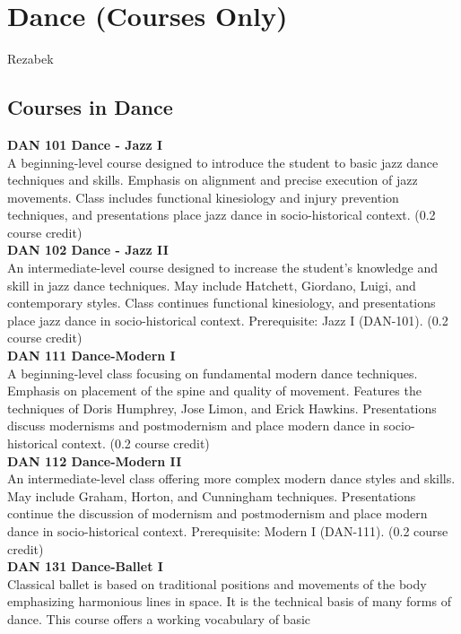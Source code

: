 \documentclass[
  letterpaper,
]{scrbook}
\begin{document}
\section{Dance (Courses Only)}\label{dance-courses-only}

Rezabek

\subsection{Courses in Dance}\label{courses-in-dance}

\textbf{DAN 101 Dance - Jazz I}\\
A beginning-level course designed to introduce the student to basic jazz
dance techniques and skills. Emphasis on alignment and precise execution
of jazz movements. Class includes functional kinesiology and injury
prevention techniques, and presentations place jazz dance in
socio-historical context. (0.2 course credit)\\
\textbf{DAN 102 Dance - Jazz II}\\
An intermediate-level course designed to increase the student's
knowledge and skill in jazz dance techniques. May include Hatchett,
Giordano, Luigi, and contemporary styles. Class continues functional
kinesiology, and presentations place jazz dance in socio-historical
context. Prerequisite: Jazz I (DAN-101). (0.2 course credit)\\
\textbf{DAN 111 Dance-Modern I}\\
A beginning-level class focusing on fundamental modern dance techniques.
Emphasis on placement of the spine and quality of movement. Features the
techniques of Doris Humphrey, Jose Limon, and Erick Hawkins.
Presentations discuss modernisms and postmodernism and place modern
dance in socio-historical context. (0.2 course credit)\\
\textbf{DAN 112 Dance-Modern II}\\
An intermediate-level class offering more complex modern dance styles
and skills. May include Graham, Horton, and Cunningham techniques.
Presentations continue the discussion of modernism and postmodernism and
place modern dance in socio-historical context. Prerequisite: Modern I
(DAN-111). (0.2 course credit)\\
\textbf{DAN 131 Dance-Ballet I}\\
Classical ballet is based on traditional positions and movements of the
body emphasizing harmonious lines in space. It is the technical basis of
many forms of dance. This course offers a working vocabulary of basic
\end{document}
